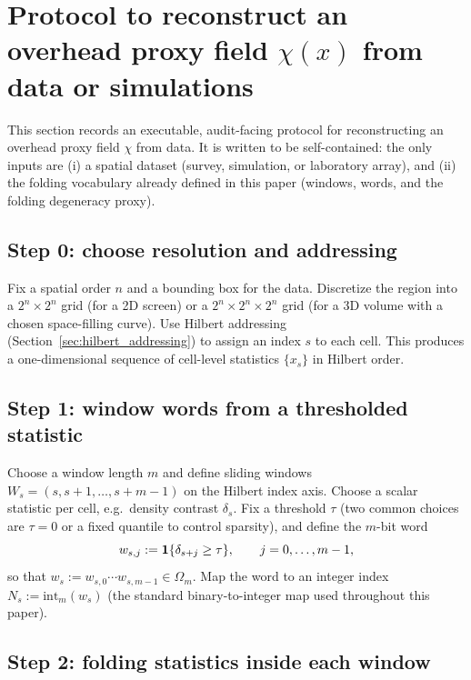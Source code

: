 \section{Protocol to reconstruct an overhead proxy field \texorpdfstring{$\chi(x)$}{chi(x)} from data or simulations}
\label{app:chi_reconstruction_protocol}

This section records an executable, audit-facing protocol for reconstructing an overhead proxy field $\chi$ from data.
It is written to be self-contained: the only inputs are (i) a spatial dataset (survey, simulation, or laboratory array), and (ii) the folding vocabulary already defined in this paper (windows, words, and the folding degeneracy proxy).

\subsection{Step 0: choose resolution and addressing}
\label{subsec:chi_step0}

Fix a spatial order $n$ and a bounding box for the data.
Discretize the region into a $2^n\times 2^n$ grid (for a 2D screen) or a $2^n\times 2^n\times 2^n$ grid (for a 3D volume with a chosen space-filling curve).
Use Hilbert addressing (Section~\ref{sec:hilbert_addressing}) to assign an index $s$ to each cell.
This produces a one-dimensional sequence of cell-level statistics $\{x_s\}$ in Hilbert order.

\subsection{Step 1: window words from a thresholded statistic}
\label{subsec:chi_step1_words}

Choose a window length $m$ and define sliding windows $W_s=(s,s+1,\dots,s+m-1)$ on the Hilbert index axis.
Choose a scalar statistic per cell, e.g.\ density contrast $\delta_s$.
Fix a threshold $\tau$ (two common choices are $\tau=0$ or a fixed quantile to control sparsity), and define the $m$-bit word
\[
w_{s,j}:=\mathbf{1}\{\delta_{s+j}\ge \tau\},\qquad j=0,\dots,m-1,
\]
so that $w_s:=w_{s,0}\cdots w_{s,m-1}\in\Omega_m$.
Map the word to an integer index $N_s:=\mathrm{int}_m(w_s)$ (the standard binary-to-integer map used throughout this paper).

\subsection{Step 2: folding statistics inside each window}
\label{subsec:chi_step2_stats}

